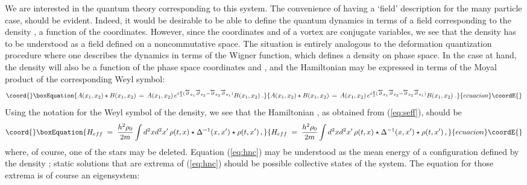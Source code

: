 \documentclass[a4paper,12pt]{article} \tolerance=200
\begin{document}
We are interested in the quantum theory corresponding to this system.
The convenience of having a `field' description for the many particle
case, should be evident. Indeed, it would be desirable to be able to
define the quantum dynamics in terms of a field corresponding to the
density \coordHE{}, a function of the coordinates. However, since the
coordinates \coordHE{} and \coordHE{} of a vortex are conjugate variables, we
see that the density has to be understood as a field defined on a
noncommutative space. The situation is entirely analogous to the
deformation quantization procedure \cite{Zachos} where one describes
the dynamics in terms of the Wigner function, which defines a density
on phase space. In the case at hand, the density will also be a
function of the phase space coordinates \coordHE{} and \coordHE{}, and the
Hamiltonian \coordHE{} may be expressed in terms of the Moyal product
\myHighlight{$\star$}\coordHE{} of the corresponding Weyl symbol:
\begin{equation}\coord{}\boxEquation{
A(x_1,x_2) \star B(x_1,x_2) \,=\, A (x_1,x_2)\, e^{i \frac{\theta}{2} 
({\overleftarrow \partial_{x_1}} {\overrightarrow \partial_{x_2}} 
- {\overleftarrow \partial_{x_2}} {\overrightarrow \partial_{x_1}})}B(x_1,x_2)\;.
}{
A(x_1,x_2) \star B(x_1,x_2) \,=\, A (x_1,x_2)\, e^{i \frac{\theta}{2} 
({\overleftarrow \partial_{x_1}} {\overrightarrow \partial_{x_2}} 
- {\overleftarrow \partial_{x_2}} {\overrightarrow \partial_{x_1}})}B(x_1,x_2)\;.
}{ecuacion}\coordE{}\end{equation}
Using the notation \myHighlight{$\rho$}\coordHE{} for the Weyl symbol of the density, we see that
the Hamiltonian \coordHE{}, as obtained from (\ref{eq:seff}), should be
\begin{equation}\coord{}\boxEquation{\label{eq:hnc}
H_{eff}\;=\; \frac{h^2 \rho_0}{2 m} \int d^2x d^2x'\, \rho(t,x)\star \Delta^{-1}(x,x') \star \rho(t,x') \,,
}{H_{eff}\;=\; \frac{h^2 \rho_0}{2 m} \int d^2x d^2x'\, \rho(t,x)\star \Delta^{-1}(x,x') \star \rho(t,x') \,,
}{ecuacion}\coordE{}\end{equation}
where, of course, one of the stars may be deleted. Equation
(\ref{eq:hnc}) may be understood as the mean energy of a configuration
defined by the density \myHighlight{$\rho$}\coordHE{}; static solutions that are extrema of
(\ref{eq:hnc}) should be possible collective states of the system. The
equation for those extrema is of course an eigensystem:
\end{document}
